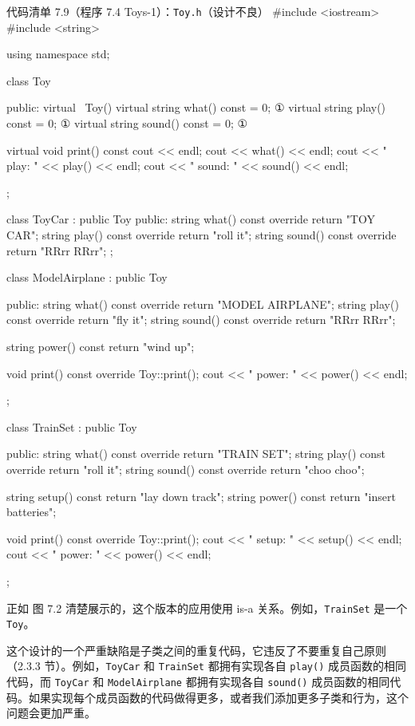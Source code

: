 \begin{codeboxt}{代码清单 7.9（程序 7.4 Toys-1）：\texttt{Toy.h}（设计不良）}
#include <iostream>
#include <string>

using namespace std;

class Toy
{
public:
    virtual ~Toy() {}
    virtual string what()  const = 0;        ①
    virtual string play()  const = 0;        ①
    virtual string sound() const = 0;        ①

    virtual void print() const
    {
        cout << endl;
        cout << what() << endl;
        cout << "   play: " << play() << endl;
        cout << "  sound: " << sound() << endl;
    }
};

class ToyCar : public Toy
{
public:
    string what()  const override { return "TOY CAR"; }
    string play()  const override { return "roll it"; }
    string sound() const override { return "RRrr RRrr"; }
};

class ModelAirplane : public Toy
{
public:
    string what()  const override { return "MODEL AIRPLANE"; }
    string play()  const override { return "fly it"; }
    string sound() const override { return "RRrr RRrr"; }

    string power() const { return "wind up"; }

    void print() const override
    {
        Toy::print();
        cout << "  power: " << power() << endl;
    }
};

class TrainSet : public Toy
{
public:
    string what()  const override { return "TRAIN SET"; }
    string play()  const override { return "roll it"; }
    string sound() const override { return "choo choo"; }

    string setup() const { return "lay down track"; }
    string power() const { return "insert batteries"; }

    void print() const override
    {
        Toy::print();
        cout << "  setup: " << setup() << endl;
        cout << "  power: " << power() << endl;
    }
};
\end{codeboxt}
\par

正如 图 7.2 清楚展示的，这个版本的应用使用 is-a 关系。例如，\texttt{TrainSet} 是一个 \texttt{Toy}。

这个设计的一个严重缺陷是子类之间的重复代码，它违反了不要重复自己原则（2.3.3 节）。例如，\texttt{ToyCar} 和 \texttt{TrainSet} 都拥有实现各自 \texttt{play()} 成员函数的相同代码，而 \texttt{ToyCar} 和 \texttt{Model\allowbreak{}Airplane} 都拥有实现各自 \texttt{sound()} 成员函数的相同代码。如果实现每个成员函数的代码做得更多，或者我们添加更多子类和行为，这个问题会更加严重。

